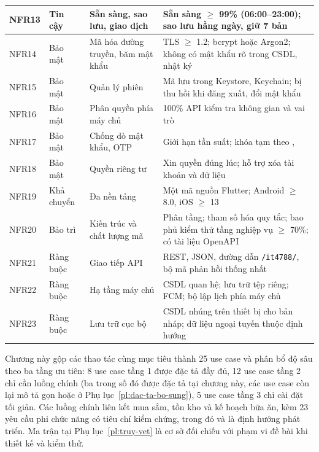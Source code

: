 {\begin{longtable}{|C{1.35cm}|L{2.5cm}|L{\dimexpr{}\arrayrulewidth-1.35cm-2.5cm-5.0cm\relax}|L{5.0cm}|}
NFR13 & Tin cậy & Sẵn sàng, sao lưu, giao dịch & Sẵn sàng $\ge$ 99\% (06:00–23:00); sao lưu hằng ngày, giữ 7 bản\\ \hline
NFR14 & Bảo mật & Mã hóa đường truyền, băm mật khẩu & TLS $\ge$ 1.2; bcrypt hoặc Argon2; không có mật khẩu rõ trong CSDL, nhật ký\\ \hline
NFR15 & Bảo mật & Quản lý phiên & Mã lưu trong Keystore, Keychain; bị thu hồi khi đăng xuất, đổi mật khẩu\\ \hline
NFR16 & Bảo mật & Phân quyền phía máy chủ & 100\% API kiểm tra không gian và vai trò\\ \hline
NFR17 & Bảo mật & Chống dò mật khẩu, OTP & Giới hạn tần suất; khóa tạm theo , \\ \hline
NFR18 & Bảo mật & Quyền riêng tư & Xin quyền đúng lúc; hỗ trợ xóa tài khoản và dữ liệu\\ \hline
NFR19 & Khả chuyển & Đa nền tảng & Một mã nguồn Flutter; Android $\ge$ 8.0, iOS $\ge$ 13\\ \hline
NFR20 & Bảo trì & Kiến trúc và chất lượng mã & Phân tầng; tham số hóa quy tắc; bao phủ kiểm thử tầng nghiệp vụ $\ge$ 70\%; có tài liệu OpenAPI\\ \hline
NFR21 & Ràng buộc & Giao tiếp API & REST, JSON, đường dẫn \texttt{/it4788/}, bộ mã phản hồi thống nhất\\ \hline
NFR22 & Ràng buộc & Hạ tầng máy chủ & CSDL quan hệ; lưu trữ tệp riêng; FCM; bộ lập lịch phía máy chủ\\ \hline
NFR23 & Ràng buộc & Lưu trữ cục bộ & CSDL nhúng trên thiết bị cho bản nháp; dữ liệu ngoại tuyến thuộc định hướng \\ \hline
\end{longtable}
}

Chương này gộp các thao tác cùng mục tiêu thành 25 use case và phân bổ độ sâu theo ba tầng ưu tiên: 8 use case tầng 1 được đặc tả đầy đủ, 12 use case tầng 2 chỉ cần luồng chính (ba trong số đó được đặc tả tại chương này, các use case còn lại mô tả gọn hoặc ở Phụ lục~\ref{pl:dac-ta-bo-sung}), 5 use case tầng 3 chỉ cài đặt tối giản. Các luồng chính liên kết mua sắm, tồn kho và kế hoạch bữa ăn, kèm 23 yêu cầu phi chức năng có tiêu chí kiểm chứng, trong đó  và  là định hướng phát triển. Ma trận tại Phụ lục~\ref{pl:truy-vet} là cơ sở đối chiếu với phạm vi đề bài khi thiết kế và kiểm thử.
